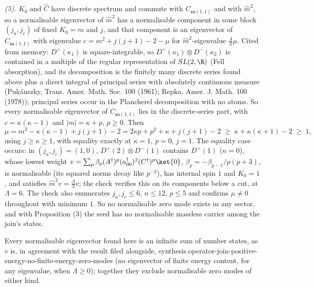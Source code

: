 \emph{(5).} $K_{0}$ and $\hat C$ have discrete spectrum and commute with $C_{\mathfrak{su}(1,1)}$ and with $\hat m^{2}$, so a normalisable eigenvector of $\hat m^{2}$ has a normalisable component in some block $(j_{a}, j_{c})$ of fixed $K_{0} = m$ and $j$, and that component is an eigenvector of $C_{\mathfrak{su}(1,1)}$ with eigenvalue $c = m^{2} + j(j+1) - 2 - \mu$ for $\hat m^{2}$-eigenvalue $\tfrac{\Lambda}{3}\mu$. Cited from memory: $D^{+}(\kappa_{1})$ is square-integrable, so $D^{+}(\kappa_{1}) \otimes D^{-}(\kappa_{2})$ is contained in a multiple of the regular representation of $SL(2,\R)$ (Fell absorption), and its decomposition is the finitely many discrete series found above plus a direct integral of principal series with absolutely continuous measure (Pukánszky, Trans. Amer. Math. Soc. 100 (1961); Repka, Amer. J. Math. 100 (1978)); principal series occur in the Plancherel decomposition with no atoms. So every normalisable eigenvector of $C_{\mathfrak{su}(1,1)}$ lies in the discrete-series part, with $c = \kappa(\kappa - 1)$ and $|m| = \kappa + p$, $p \ge 0$. Then
\[
\mu = m^{2} - \kappa(\kappa - 1) + j(j+1) - 2 = 2\kappa p + p^{2} + \kappa + j(j+1) - 2 \;\ge\; \kappa + \kappa(\kappa + 1) - 2 \;\ge\; 1,
\]
using $j \ge \kappa \ge 1$, with equality exactly at $\kappa = 1$, $p = 0$, $j = 1$. The equality case occurs: in $(j_{a}, j_{c}) = (1, 0)$, $D^{+}(2) \otimes D^{-}(1)$ contains $D^{+}(1)$ ($n = 0$), whose lowest weight $v = \sum_{p}\beta_{p}(A^{\dagger})^{p}(a_{00}^{\dagger})^{2}(C^{\dagger})^{p}\ket{0}$, $\beta_{p} = -\beta_{p-1}/p(p+3)$, is normalisable (its squared norms decay like $p^{-2}$), has internal spin $1$ and $K_{0} = 1$, and satisfies $\hat m^{2}v = \tfrac{\Lambda}{3}v$; the check verifies this on its components below a cut, at $\Lambda = 6$. The check also enumerates $j_{a}, j_{c} \le 6$, $n \le 12$, $p \le 5$ and confirms $\mu \neq 0$ throughout with minimum $1$. So no normalisable zero mode exists in any sector, and with Proposition (3) the seed has no normalisable massless carrier among the join's states.

Every normalisable eigenvector found here is an infinite sum of number states, as $v$ is, in agreement with the result filed alongside, synthesis.operator-join-positive-energy-no-finite-energy-zero-modes (no eigenvector of finite energy content, for any eigenvalue, when $\Lambda \ge 0$); together they exclude normalisable zero modes of either kind.

